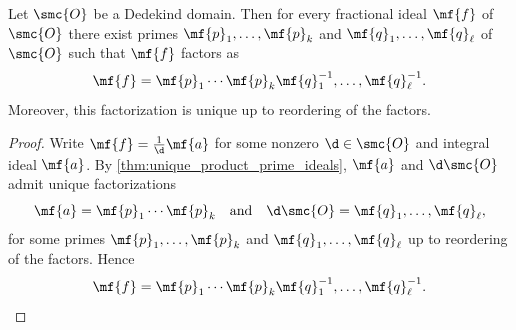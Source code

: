 \documentclass[12pt]{article}
\begin{document}
      \begin{corollary}\label{cor:fractional_ideal_prime_factorization}
        Let \(\smc{O}\) be a Dedekind domain. Then for every fractional ideal \(\mf{f}\) of \(\smc{O}\) there exist primes \(\mf{p}_{1},\ldots,\mf{p}_{k}\) and \(\mf{q}_{1},\ldots,\mf{q}_{\ell}\) of \(\smc{O}\) such that \(\mf{f}\) factors as
        \[
          \mf{f} = \mf{p}_{1} \cdots \mf{p}_{k}\mf{q}_{1}^{-1},\ldots,\mf{q}_{\ell}^{-1}.
        \]
        Moreover, this factorization is unique up to reordering of the factors.
      \end{corollary}
      \begin{proof}
        Write \(\mf{f} = \frac{1}{\d}\mf{a}\) for some nonzero \(\d \in \smc{O}\) and integral ideal \(\mf{a}\). By \cref{thm:unique_product_prime_ideals}, \(\mf{a}\) and \(\d\smc{O}\) admit unique factorizations
        \[
          \mf{a} = \mf{p}_{1} \cdots \mf{p}_{k} \quad \text{and} \quad \d\smc{O} = \mf{q}_{1},\ldots,\mf{q}_{\ell},
        \]
        for some primes \(\mf{p}_{1},\ldots,\mf{p}_{k}\) and \(\mf{q}_{1},\ldots,\mf{q}_{\ell}\) up to reordering of the factors. Hence
        \[
          \mf{f} = \mf{p}_{1} \cdots \mf{p}_{k}\mf{q}_{1}^{-1},\ldots,\mf{q}_{\ell}^{-1}.
        \]
      \end{proof}
\end{document}
